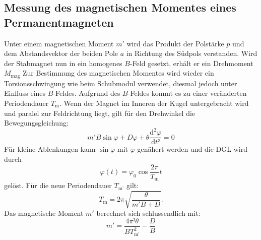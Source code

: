 \subsection{Messung des magnetischen Momentes eines Permanentmagneten}
Unter einem magnetischen Moment $m'$ wird das Produkt der Polstärke $p$
 und dem Abstandsvektor der beiden Pole $a$ in Richtung des Südpols verstanden.
  Wird der Stabmagnet nun in ein homogenes $B$-Feld gesetzt,
   erhält er ein Drehmoment $M_{\text{mag}}$
Zur Bestimmung des magnetischen Momentes wird wieder ein Torsionsschwingung wie
 beim Schubmodul verwendet, diesmal jedoch unter Einfluss eines $B$-Feldes.
  Aufgrund des $B$-Feldes kommt es zu einer veränderten Periodendauer $T_\text{m}$.  Wenn
  der Magnet im Inneren der Kugel untergebracht wird und paralel zur Feldrichtung
  liegt, gilt für den Drehwinkel \varphi die Bewegungsgleichung:
  \begin{equation}
    m'B\sin\varphi + D\varphi + \theta\frac{\text{d}^2\varphi}{\text{d}t²} = 0
  \end{equation}
  Für kleine Ablenkungen kann $\sin \varphi$ mit $\varphi$ genähert werden und die DGL wird durch
  \begin{equation}
    \varphi(t) = \varphi_\text{0} \cos\frac{2\pi}{T_\text{m}}t
  \end{equation}
  gelöst. Für die neue Periodendauer $T_\text{m'}$ gilt:
  \begin{equation}
    T_\text{m} = 2\pi\sqrt{\frac{\theta}{m'B + D}}\text{.}
  \end{equation}
Das magnetische Moment $m'$ berechnet sich schlussendlich mit:
\begin{equation}
  m' = \frac{4\pi²\theta}{BT_\text{m'}^2} - \frac{D}{B}
\end{equation}
